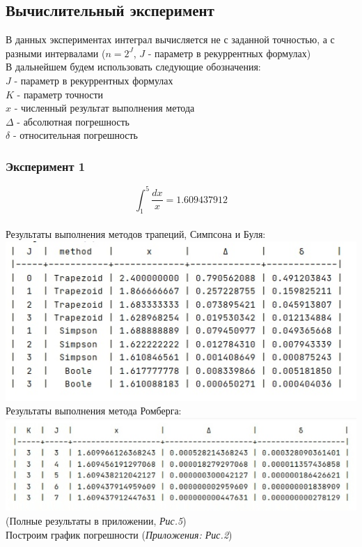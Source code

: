 \documentclass[14pt, titlepage, a4paper]{extarticle} %
\begin{document}
	\pagebreak
	\subsection*{Вычислительный эксперимент}
	
	В данных экспериментах интеграл вычисляется не с заданной точностью, а с разными интервалами ($n = 2^{J}$, $J$ - параметр в рекуррентных формулах)\vspace{5pt}
	~\\
	В дальнейшем будем использовать следующие обозначения:\\
	$J$ - параметр в рекуррентных формулах\\
	$K$ - параметр точности\\
	$x$ - численный результат выполнения метода\\
	$\Delta$ - абсолютная погрешность\\
	$\delta$ - относительная погрешность
	 
	\subsubsection*{Эксперимент 1}

	\[\int_{1}^{5} \frac{dx}{x} = 1.609437912\]
	~\\
	Результаты выполнения методов трапеций, Симпсона и Буля:
	~\\
	
	\includegraphics[width=400pt]{f1.jpeg}
	\\
	Результаты выполнения метода Ромберга:
	~\\
	
	\includegraphics[width=400pt]{fr1.jpeg}\\
	(Полные результаты в приложении, \textit{Рис.5})
	~\\
	Построим график погрешности (\textit{Приложения: Рис.2})
	
\end{document}
